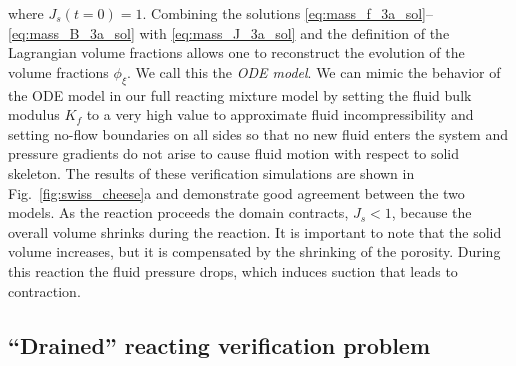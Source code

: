 \documentclass[11pt]{article}
\begin{document}
%
where $J_s(t=0) = 1$. Combining the solutions \eqref{eq:mass_f_3a_sol}--\eqref{eq:mass_B_3a_sol} with \eqref{eq:mass_J_3a_sol} and the definition of the Lagrangian volume fractions allows one to reconstruct the evolution of the volume fractions $\phi_\xi$. We call this the \emph{ODE model}. We can mimic the behavior of the ODE model in our full reacting mixture model by setting the fluid bulk modulus $K_f$ to a very high value to approximate fluid incompressibility and setting no-flow boundaries on all sides so that no new fluid enters the system and pressure gradients do not arise to cause fluid motion with respect to solid skeleton.  The results of these verification simulations are shown in Fig.~\ref{fig:swiss_cheese}a and demonstrate good agreement between the two models. As the reaction proceeds the domain contracts, $J_s<1$, because the overall volume shrinks during the reaction. It is important to note that the solid volume increases, but it is compensated by the shrinking of the porosity. During this reaction the fluid pressure drops, which induces suction that leads to contraction.

\subsection{``Drained'' reacting verification problem}\label{sec:drained}
\end{document}
